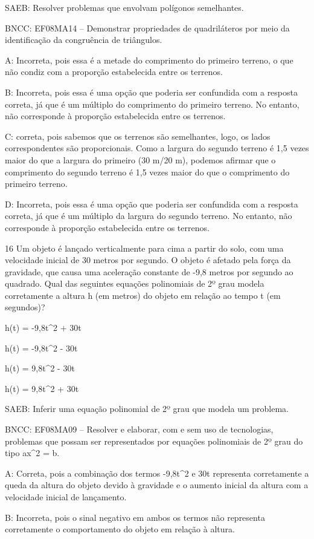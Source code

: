 {SAEB: Resolver problemas que envolvam polígonos semelhantes.

BNCC: EF08MA14 -- Demonstrar propriedades de quadriláteros por meio da
identificação da congruência de triângulos.

A: Incorreta, pois essa é a metade do comprimento do primeiro terreno, o
que não condiz com a proporção estabelecida entre os terrenos.

B: Incorreta, pois essa é uma opção que poderia ser confundida com a
resposta correta, já que é um múltiplo do comprimento do primeiro
terreno. No entanto, não corresponde à proporção estabelecida entre os
terrenos.

C: correta, pois sabemos que os terrenos são semelhantes, logo, os lados
correspondentes são proporcionais. Como a largura do segundo terreno é
1,5 vezes maior do que a largura do primeiro (30 m/20 m), podemos
afirmar que o comprimento do segundo terreno é 1,5 vezes maior do que o
comprimento do primeiro terreno.

D: Incorreta, pois essa é uma opção que poderia ser confundida com a
resposta correta, já que é um múltiplo da largura do segundo terreno. No
entanto, não corresponde à proporção estabelecida entre os terrenos.

\num{16} Um objeto é lançado verticalmente para cima a partir do solo, com
uma velocidade inicial de 30 metros por segundo. O objeto é afetado pela
força da gravidade, que causa uma aceleração constante de -9,8 metros
por segundo ao quadrado. Qual das seguintes equações polinomiais de 2º
grau modela corretamente a altura h (em metros) do objeto em relação ao
tempo t (em segundos)?
\item h(t) = -9,8t^2 + 30t
\item h(t) = -9,8t^2 - 30t
\item h(t) = 9,8t^2 - 30t
\item h(t) = 9,8t^2 + 30t

SAEB: Inferir uma equação polinomial de 2º grau que modela um problema.

BNCC: EF08MA09 -- Resolver e elaborar, com e sem uso de tecnologias,
problemas que possam ser representados por equações polinomiais de 2º
grau do tipo ax^2 = b.

A: Correta, pois a combinação dos termos -9,8t^2 e 30t representa
corretamente a queda da altura do objeto devido à gravidade e o aumento
inicial da altura com a velocidade inicial de lançamento.

B: Incorreta, pois o sinal negativo em ambos os termos não representa
corretamente o comportamento do objeto em relação à altura.

}
